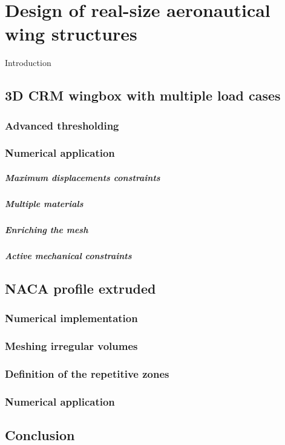 \setchapterpreamble[u]{\margintoc}
\chapter{Design of real-size aeronautical wing structures}
Introduction
\section{3D CRM wingbox with multiple load cases}

\subsection{Advanced thresholding}

\subsection{Numerical application}

\paragraph{Maximum displacements constraints}

\paragraph{Multiple materials}

\paragraph{Enriching the mesh}

\paragraph{Active mechanical constraints}

\section{NACA profile extruded}

\subsection{Numerical implementation}

\subsection{Meshing irregular volumes}

\subsection{Definition of the repetitive zones}

\subsection{Numerical application}

\section{Conclusion}